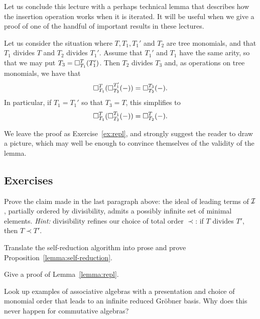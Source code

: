 Let us conclude this lecture with a perhaps technical
lemma that describes how the insertion operation
works when it is iterated. It will be useful when we
give a proof of one of the handful of important results 
in these lectures.

\begin{lemma}\label{lemma:repl}
Let us consider the situation where $T,T_1,T_1'$ and $T_2$ 
are tree monomials, and that $T_1$ divides $T$ and
$T_2$ divides $T_1'$. Assume that $T_1'$ and $T_1$ have
the same arity, so that we may put $T_3 = \square_{T_1}^{T}(T_1')$.
Then $T_2$ divides $T_3$ and, as operations on tree monomials,
we have that
\[ 
\square_{T_1}^{T}(\square_{T_2}^{T_1'}(-))= 
 	\square_{T_2}^{T_3}(-).
\]
In particular, if $T_1=T_1'$ so that $T_3 = T$, this
simplifies to 
\[ 
\square_{T_1}^{T}(\square_{T_2}^{T_1}(-))= 
 	\square_{T_2}^{T}(-).
\]
\end{lemma}

We leave the proof as Exercise~\ref{ex:repl}, and
strongly suggest the reader to draw a picture, which
may well be enough to convince themselves of the
validity of the lemma. 

\subsection{Exercises}

\begin{question}
Prove the claim made in the last paragraph above:
the ideal of leading terms of $\mathcal{I}$, partially ordered by
divisibility, admits a possibly infinite set of
minimal elements. \emph{Hint:} divisibility
refines our choice of total order $\prec$: if 
$T$ divides $T'$, then $T\prec T'$. 
\end{question}

\begin{question}\label{ex:self-reduction}
Translate the self-reduction algorithm into prose
and prove Proposition~\ref{lemma:self-reduction}.
\end{question}

\begin{question}\label{ex:repl}
Give a proof of Lemma~\ref{lemma:repl}.
\end{question}

\begin{question}
Look up examples
of associative algebras
with a presentation and choice
of monomial order that leads to
an infinite reduced Gr\"obner
basis. Why does this never happen
for commutative algebras?
\end{question}
\vfill

 